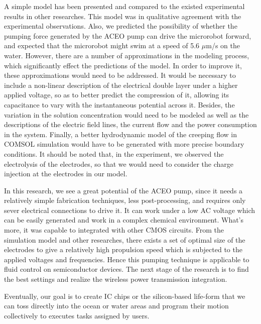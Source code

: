 \documentclass[journal,svgnames,twocolumn,x11names]{IEEEtran}
\begin{document}
A simple model has been presented and compared to the existed experimental results in other researches. This model was in qualitative agreement with the experimental observations. Also, we predicted the possibility of whether the pumping force generated by the ACEO pump can drive the microrobot forward, and expected that the microrobot might swim at a speed of 5.6 $\mu$m/s on the water. However, there are a number of approximations in the modeling process, which significantly effect the predictions of the model. In order to improve it, these approximations would need to be addressed. It would be necessary to include a non-linear description of the electrical double layer under a higher applied voltage, so as to better predict the compression of it, allowing its capacitance to vary with the instantaneous potential across it\cite{Brown2000}. Besides, the variation in the solution concentration would need to be modeled as well as the descriptions of the electric field lines, the current flow and the power consumption in the system. Finally, a better hydrodynamic model of the creeping flow in COMSOL simulation would have to be generated with more precise boundary conditions. It should be noted that, in the experiment, we observed the electrolysis of the electrodes, so that we would need to consider the charge injection at the electrodes in our model. 

In this research, we see a great potential of the ACEO pump, since it needs a relatively simple fabrication techniques, less post-processing, and requires only sever electrical connections to drive it. It can work under a low AC voltage which can be easily generated and work in a complex chemical environment. What's more, it was capable to integrated with other CMOS circuits. From the simulation model and other researches, there exists a set of optimal size of the electrodes to give a relatively high propulsion speed which is subjected to the applied voltages and frequencies. Hence this pumping technique is applicable to fluid control on semiconductor devices. The next stage of the research is to find the best settings and realize the wireless power transmission integration.

Eventually, our goal is to create IC chips or the silicon-based life-form that we can toss directly into the ocean or water areas and program their motion collectively to executes tasks assigned by users. 

 
\onecolumn
\appendices
\end{document}
